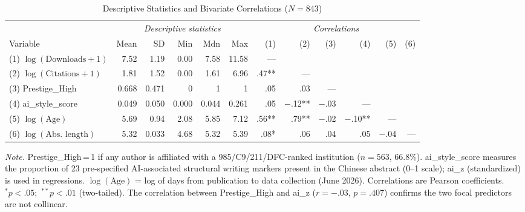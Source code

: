 \documentclass[12pt,a4paper]{article}
\begin{document}
\begin{table}[htbp]
\centering
\caption{Descriptive Statistics and Bivariate Correlations ($N = 843$)}
\label{tab:descriptives}
\begin{threeparttable}
\small
\begin{tabular}{lrrrrr|rrrrrr}
\toprule
& \multicolumn{5}{c|}{\textit{Descriptive statistics}} &
  \multicolumn{6}{c}{\textit{Correlations}} \\
\cmidrule(lr){2-6}\cmidrule(lr){7-12}
Variable & Mean & SD & Min & Mdn & Max &
  (1) & (2) & (3) & (4) & (5) & (6) \\
\midrule
(1) $\log(\text{Downloads}+1)$ & 7.52 & 1.19 & 0.00 & 7.58 & 11.58 &
  ---  &      &     &     &     &    \\
(2) $\log(\text{Citations}+1)$ & 1.81 & 1.52 & 0.00 & 1.61 & 6.96 &
  .47** & --- &     &     &     &   \\
(3) Prestige\_High & 0.668 & 0.471 & 0 & 1 & 1 &
  .05 & .03 & --- &     &     &   \\
(4) ai\_style\_score & 0.049 & 0.050 & 0.000 & 0.044 & 0.261 &
  .05 & $-$.12** & $-$.03 & --- &     &   \\
(5) $\log(\text{Age})$ & 5.69 & 0.94 & 2.08 & 5.85 & 7.12 &
  .56** & .79** & $-$.02 & $-$.10** & --- &  \\
(6) $\log(\text{Abs.\ length})$ & 5.32 & 0.033 & 4.68 & 5.32 & 5.39 &
  .08* & .06  & .04  & .05   & $-$.04 & --- \\
\bottomrule
\end{tabular}
\begin{tablenotes}
\footnotesize
\item \textit{Note.} Prestige\_High\,=\,1 if any author is affiliated with a
  985/C9/211/DFC-ranked institution ($n=563$, 66.8\%).
  ai\_style\_score measures the proportion of 23 pre-specified
  AI-associated structural writing markers present in the Chinese
  abstract (0--1 scale); ai\_z (standardized) is used in regressions.
  $\log(\text{Age})$ = log of days from publication to data collection (June 2026).
  Correlations are Pearson coefficients.
  $^{*}p<.05$;\ $^{**}p<.01$ (two-tailed).
  The correlation between Prestige\_High and ai\_z ($r=-.03$, $p=.407$)
  confirms the two focal predictors are not collinear.
\end{tablenotes}
\end{threeparttable}
\end{table}

\newpage
\end{document}

